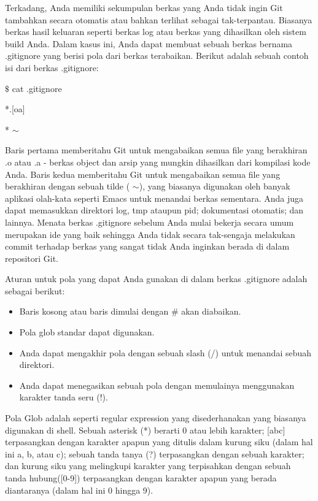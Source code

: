 Terkadang, Anda memiliki sekumpulan berkas yang Anda tidak ingin Git tambahkan secara otomatis atau bahkan terlihat sebagai tak-terpantau. Biasanya berkas hasil keluaran seperti berkas log atau berkas yang dihasilkan oleh sistem build Anda. Dalam kasus ini, Anda dapat membuat sebuah berkas bernama .gitignore yang berisi pola dari berkas terabaikan. Berikut adalah sebuah contoh isi dari berkas .gitignore: \par
\noindent 
 $  \$  $ cat .gitignore \par
\noindent 
*.[oa] \par
\noindent 
* $  \sim  $ \par
\noindent 
Baris pertama memberitahu Git untuk mengabaikan semua file yang berakhiran .o atau .a - berkas object dan arsip yang mungkin dihasilkan dari kompilasi kode Anda. Baris kedua memberitahu Git untuk mengabaikan semua file yang berakhiran dengan sebuah tilde ( $  \sim  $), yang biasanya digunakan oleh banyak aplikasi olah-kata seperti Emacs untuk menandai berkas sementara. Anda juga dapat memasukkan direktori log, tmp ataupun pid; dokumentasi otomatis; dan lainnya. Menata berkas .gitignore sebelum Anda mulai bekerja secara umum merupakan ide yang baik sehingga Anda tidak secara tak-sengaja melakukan commit terhadap berkas yang sangat tidak Anda inginkan berada di dalam repositori Git. \par
\noindent 
Aturan untuk pola yang dapat Anda gunakan di dalam berkas .gitignore adalah sebagai berikut: \par
\noindent 
\begin{itemize}
\item Baris kosong atau baris dimulai dengan  $  \#  $ akan diabaikan. \par
\noindent 
\item Pola glob standar dapat digunakan. \par
\noindent 
\item Anda dapat mengakhir pola dengan sebuah slash (/) untuk menandai sebuah direktori. \par
\noindent 
\item Anda dapat menegasikan sebuah pola dengan memulainya menggunakan karakter tanda seru (!).\end{itemize}
 \par
\noindent 
Pola Glob adalah seperti regular expression yang disederhanakan yang biasanya digunakan di shell. Sebuah asterisk (*) berarti 0 atau lebih karakter; [abc] terpasangkan dengan karakter apapun yang ditulis dalam kurung siku (dalam hal ini a, b, atau c); sebuah tanda tanya (?) terpasangkan dengan sebuah karakter; dan kurung siku yang melingkupi karakter yang terpisahkan dengan sebuah tanda hubung([0-9]) terpasangkan dengan karakter apapun yang berada diantaranya (dalam hal ini 0 hingga 9). \par
